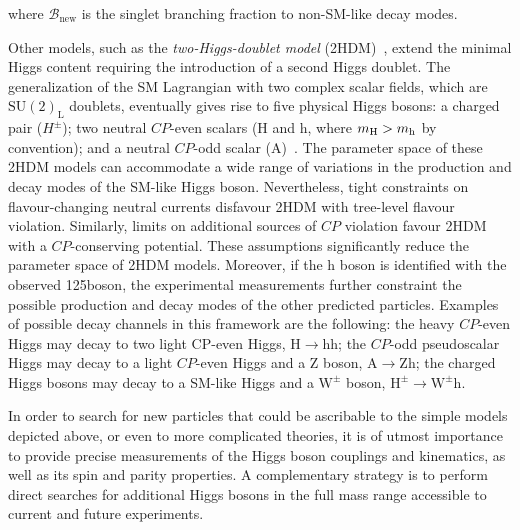 \noindent where $\mathcal{B}_\mathrm{new}$ is the singlet branching fraction to non-SM-like decay modes.

Other models, such as the \emph{two-Higgs-doublet model} (2HDM)~\cite{Branco:2011iw}, extend the minimal Higgs content requiring the introduction of a second Higgs doublet. 
The generalization of the SM Lagrangian with two complex scalar fields, which are $\mathrm{SU(2)_L}$ doublets, eventually gives rise to five physical Higgs bosons: a charged pair ($H^{\pm}$); two neutral $CP$-even scalars (H and h, where $m_{\rm H}>m_{\rm h}$ by convention); and a neutral $CP$-odd scalar (A)~\cite{Craig:2013hca}. The parameter space of these 2HDM models can accommodate a wide range of variations in the production and decay modes of the SM-like Higgs boson. Nevertheless, tight constraints on flavour-changing neutral currents disfavour 2HDM with tree-level flavour violation. Similarly, limits on additional sources of $CP$ violation favour 2HDM with a $CP$-conserving potential. These assumptions significantly reduce the parameter space of 2HDM models. Moreover, if the h boson is identified with the observed 125\GeV boson, the experimental measurements further constraint the possible production and decay modes of the other predicted particles. Examples of possible decay channels in this framework are the following: the  heavy  $CP$-even  Higgs  may  decay  to  two  light  CP-even  Higgs, $\mathrm{H \to hh}$; the $CP$-odd pseudoscalar Higgs may decay to a light $CP$-even Higgs and a Z boson, $\mathrm{A \to Zh}$; the charged Higgs bosons may decay to a SM-like Higgs and a $\mathrm{W}^\pm$ boson, $\mathrm{H^\pm \to \mathrm{W}^\pm h}$.

In order to search for new particles that could be ascribable to the simple models depicted above, or even to more complicated theories, it is of utmost importance to provide precise measurements of the Higgs boson couplings and kinematics, as well as its spin and parity properties. A complementary strategy is to perform direct searches for additional Higgs bosons in the full mass range accessible to current and future experiments.
